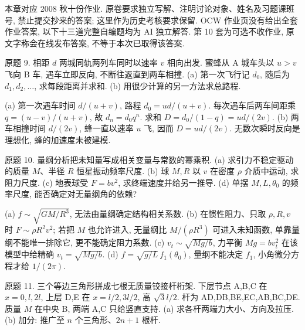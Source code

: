 \label{ch:advancedps}
本章对应 2008 秋十份作业. 原卷要求独立写解、注明讨论对象、姓名及习题课班号, 禁止提交抄来的答案; 这里作为历史考核要求保留. OCW 作业页没有给出全套作业答案, 以下十三道完整自编题均为 AI 独立解答. 第 10 套为可选不收作业, 原文字称会在线发布答案, 不等于本次已取得该答案.

\begin{exercise}
原题 9. 相距 $d$ 两城同轨两列车同时以速率 $v$ 相向出发. 蜜蜂从 A 城车头以 $u>v$ 飞向 B 车, 遇车立即反向, 不断往返直到两车相撞. (a) 第一次飞行记 $d_0$, 随后为 $d_1,d_2,\ldots$, 求每段距离并求和. (b) 用很少计算的另一方法求总路程.
\end{exercise}
\begin{solution}
(a) 第一次遇车时间 $d/(u+v)$, 路程 $d_0=ud/(u+v)$. 每次遇车后两车间距乘 $q=(u-v)/(u+v)$, 故 $d_n=d_0q^n$. 求和 $D=d_0/(1-q)=ud/(2v)$. (b) 两车相撞时间 $d/(2v)$, 蜂一直以速率 $u$ 飞, 因而 $D=u d/(2v)$. 无数次瞬时反向是理想化, 蜂的加速度未被建模.
\end{solution}
\begin{exercise}
原题 10. 量纲分析把未知量写成相关变量与常数的幂乘积. (a) 求引力不稳定驱动的质量 $M$、半径 $R$ 恒星振动频率尺度. (b) 球 $M,R$ 以 $v$ 在密度 $\rho$ 介质中运动, 求阻力尺度. (c) 地表球受 $F=bv^2$, 求终端速度并给另一推导. (d) 单摆 $M,L,\theta_0$ 的频率尺度, 能否确定对无量纲角的依赖?
\end{exercise}
\begin{solution}
(a) $f\sim\sqrt{GM/R^3}$, 无法由量纲确定结构相关系数. (b) 在惯性阻力、只取 $\rho,R,v$ 时 $F\sim\rho R^2v^2$; 若把 $M$ 也允许进入, 无量纲比 $M/(\rho R^3)$ 可进入未知函数, 单靠量纲不能唯一排除它, 更不能确定阻力系数. (c) $v_t\sim\sqrt{Mg/b}$, 力平衡 $Mg=bv_t^2$ 在该模型中给精确 $v_t=\sqrt{Mg/b}$. (d) $f=\sqrt{g/L}\,f_1(\theta_0)$, 量纲不能决定 $f_1$, 小角微分方程才给 $1/(2\pi)$.
\end{solution}
\begin{exercise}
原题 11. 三个等边三角形拼成七根无质量铰接杆桁架. 下层节点 A,B,C 在 $x=0,l,2l$, 上层 D,E 在 $x=l/2,3l/2$, 高 $\sqrt3l/2$. 杆为 AD,DB,BE,EC,AB,BC,DE. 质量 $M$ 在中央 B, 两端 A,C 只给竖直支持. (a) 求各杆两端力大小、方向及拉压. (b) 加分: 推广至 $n$ 个三角形、$2n+1$ 根杆.
\end{exercise}
